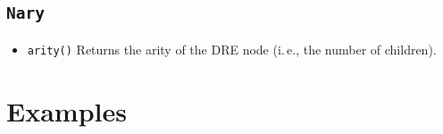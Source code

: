 \documentclass[a4paper,11pt, svgnames,titlepage]{article}
\begin{document}
\subsection{\texttt{Nary}}\label{sec:des:nary}
\begin{itemize}
	\item\texttt{arity()} Returns the arity of the DRE node (i.\,e., the number of children).
\end{itemize}



\newpage
\section{Examples}\label{sec:exam}
\end{document}
